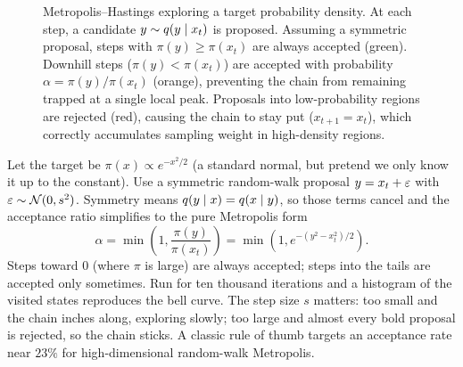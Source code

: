\begin{figure}[H]
\caption{Metropolis--Hastings exploring a target probability density. At each step, a candidate $y \sim q(y\mid x_t)$ is proposed. Assuming a symmetric proposal, steps with $\pi(y) \ge \pi(x_t)$ are always accepted (green). Downhill steps ($\pi(y) < \pi(x_t)$) are accepted with probability $\alpha = \pi(y)/\pi(x_t)$ (orange), preventing the chain from remaining trapped at a single local peak. Proposals into low-probability regions are rejected (red), causing the chain to stay put ($x_{t+1}=x_t$), which correctly accumulates sampling weight in high-density regions.}
\label{ch35:fig-mcmc-path}
\end{figure}

\begin{example}
\label{ch35:ex-mh-normal}
Let the target be $\pi(x) \propto e^{-x^2/2}$ (a standard normal, but pretend we
only know it up to the constant). Use a symmetric random-walk proposal
$y = x_t + \varepsilon$ with $\varepsilon \sim \mathcal{N}(0, s^2)$. Symmetry means
$q(y\mid x) = q(x\mid y)$, so those terms cancel and the acceptance ratio
simplifies to the pure Metropolis form
\[
  \alpha = \min\!\left(1, \frac{\pi(y)}{\pi(x_t)}\right)
         = \min\!\left(1, e^{-(y^2 - x_t^2)/2}\right).
\]
Steps toward $0$ (where $\pi$ is large) are always accepted; steps into the tails
are accepted only sometimes. Run for ten thousand iterations and a histogram of
the visited states reproduces the bell curve. The step size $s$ matters: too
small and the chain inches along, exploring slowly; too large and almost every
bold proposal is rejected, so the chain sticks. A classic rule of thumb targets
an acceptance rate near $23\%$ for high-dimensional random-walk Metropolis.
\end{example}

